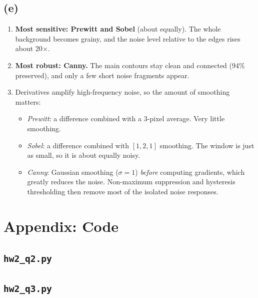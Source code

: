 \documentclass[11pt]{article}
\begin{document}
\subsection*{(e)}
\begin{enumerate}[label=\roman*., leftmargin=*]
\item \textbf{Most sensitive: Prewitt and Sobel} (about equally). The whole background becomes grainy, and the noise level relative to the edges rises about 20$\times$.
\item \textbf{Most robust: Canny.} The main contours stay clean and connected (94\% preserved), and only a few short noise fragments appear.
\item Derivatives amplify high-frequency noise, so the amount of smoothing matters:
  \begin{itemize}
  \item \emph{Prewitt}: a difference combined with a 3-pixel average. Very little smoothing.
  \item \emph{Sobel}: a difference combined with $[1,2,1]$ smoothing. The window is just as small, so it is about equally noisy.
  \item \emph{Canny}: Gaussian smoothing ($\sigma=1$) \emph{before} computing gradients, which greatly reduces the noise. Non-maximum suppression and hysteresis thresholding then remove most of the isolated noise responses.
  \end{itemize}
\end{enumerate}

\appendix
\section*{Appendix: Code}
\subsection*{\texttt{hw2\_q2.py}}

\subsection*{\texttt{hw2\_q3.py}}

\end{document}

